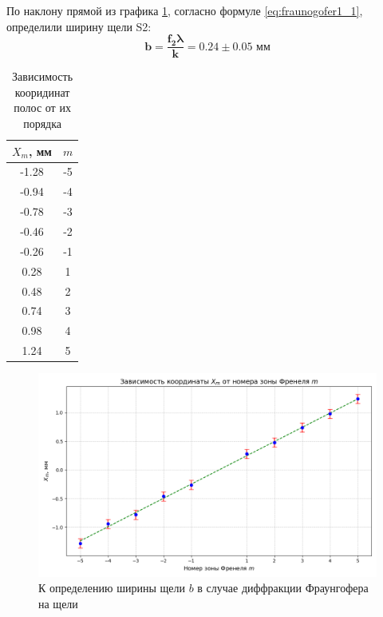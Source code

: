 По наклону прямой из графика \ref{fig:plot_B}, согласно формуле \ref{eq:fraunogofer1_1}, определили ширину щели S2:
$$
\mathbf{b = \frac{f_2\lambda}{k} = 0.24 \pm 0.05}\textbf{ мм}
$$
\begin{table}
    \centering
    \begin{tabular}{|c|c|}
        \hline
        \( X_m \), мм & \( m \) \\ \hline
        -1.28   & -5    \\ \hline
        -0.94   & -4    \\ \hline
        -0.78   & -3    \\ \hline
        -0.46   & -2    \\ \hline
        -0.26   & -1    \\ \hline
        0.28    & 1    \\ \hline
        0.48    & 2    \\ \hline
        0.74    & 3    \\ \hline
        0.98    & 4    \\ \hline
        1.24    & 5    \\ \hline
    \end{tabular}
    \caption{Зависимость кооридинат полос от их порядка} \label{table:measurements_2}
\end{table}

\begin{figure}
    \centering
    \includegraphics[width=18cm]{images/plot_B.png}
    \caption{К определению ширины щели $b$ в случае диффракции Фраунгофера на щели}\label{fig:plot_B}
\end{figure}


